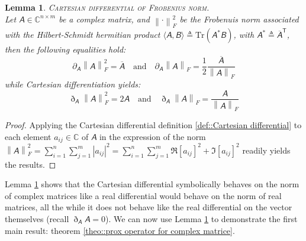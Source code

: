 \documentclass{article}
\newtheorem{lem}{Lemma}
\newcommand{\mat}[1]{\bm{\mathsfit{#1}}}
\begin{document}
  \begin{lem}\label{lem::Cartesian differential for quadratic problem} \textsc{Cartesian differential of Frobenius norm}. \\
  Let $\mat{A} \in \mathbb{C}^{n\times m}$ be a complex matrix, and $\left\| \cdot \right\|_F^2 $ be the Frobenuis norm associated with the Hilbert-Schmidt hermitian product $ \langle \mat{A} , \mat{B} \rangle \triangleq \mathrm{Tr}\left(\mat{A}^* \mat{B} \right) $, with $\mat{A}^* \triangleq \overline{\mat{A}}^\mathsf{T}$, then the following equalities hold:
  \begin{equation}
      \partial_{\mat{A}} \left\| \mat{A} \right\|_F^2 = \overline{\mat{A}} \quad \text{and} \quad \partial_{\mat{A}} \left\| \mat{A} \right\|_F = \frac{1}{2} \frac{\overline{\mat{A}}}{\left\| \mat{A} \right\|_F} 
  \end{equation}
  while Cartesian differentiation yields:
  \begin{equation}
      \eth_{\mat{A}} \left\| \mat{A} \right\|_F^2 = 2\mat{A} \quad \text{and} \quad \eth_{\mat{A}} \left\| \mat{A} \right\|_F = \frac{\mat{A}}{\left\| \mat{A} \right\|_F} 
  \end{equation}
\end{lem}

\begin{proof} 
Applying the Cartesian differential definition \ref{def::Cartesian differential} to each element $a_{ij}\in \mathbb{C}$ of $\mat{A}$ in the expression of the norm $ \left\| \mat{A} \right\|_F^2  = \sum_{i=1}^n \sum_{j=1}^m \left| a_{ij}\right|^2 =  \sum_{i=1}^n \sum_{j=1}^m \Re[ a_{ij}]^2 + \Im[ a_{ij}]^2$ readily yields the results. 
\end{proof}

Lemma \ref{lem::Cartesian differential for quadratic problem} shows that the Cartesian differential symbolically behaves on the norm of complex matrices like a real differential would behave on the norm of real matrices, all the while it does not behave like the real differential on the vector themselves (recall $\eth_{\mat{A}} \mat{A} = \mat{0}$).   
We can now use Lemma \ref{lem::Cartesian differential for quadratic problem} to demonstrate the first main result: theorem \ref{theo::prox operator for complex matrice}.
\end{document}
